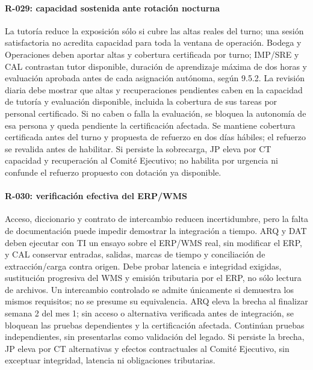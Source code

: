 \paragraph{R-029: capacidad sostenida ante rotación nocturna}
La tutoría reduce la exposición sólo si cubre las altas reales del turno; una
sesión satisfactoria no acredita capacidad para toda la ventana de operación.
Bodega y Operaciones deben aportar altas y cobertura certificada por turno;
IMP/SRE y CAL contrastan tutor disponible, duración de aprendizaje máxima de dos
horas y evaluación aprobada antes de cada asignación autónoma, según 9.5.2.
La revisión diaria debe mostrar que altas y recuperaciones pendientes caben en
la capacidad de tutoría y evaluación disponible, incluida la cobertura de sus
tareas por personal certificado. Si no caben o falla la evaluación, se bloquea
la autonomía de esa persona y queda pendiente la certificación afectada.
Se mantiene cobertura certificada antes del turno y propuesta de refuerzo en dos
días hábiles; el refuerzo se revalida antes de habilitar. Si persiste la sobrecarga,
JP eleva por CT capacidad y recuperación al Comité Ejecutivo; no habilita por
urgencia ni confunde el refuerzo propuesto con dotación ya disponible.

\paragraph{R-030: verificación efectiva del ERP/WMS}
Acceso, diccionario y contrato de intercambio reducen incertidumbre, pero la
falta de documentación puede impedir demostrar la integración a tiempo.
ARQ y DAT deben ejecutar con TI un ensayo sobre el ERP/WMS real, sin modificar
el ERP, y CAL conservar entradas, salidas, marcas de tiempo y conciliación de
extracción/carga contra origen. Debe probar latencia e integridad exigidas,
sustitución progresiva del WMS y emisión tributaria por el ERP, no sólo lectura
de archivos. Un intercambio controlado se admite únicamente si demuestra los
mismos requisitos; no se presume su equivalencia. ARQ eleva la brecha al finalizar
semana 2 del mes 1; sin acceso o alternativa verificada antes de integración,
se bloquean las pruebas dependientes y la certificación afectada. Continúan
pruebas independientes, sin presentarlas como validación del legado. Si persiste
la brecha, JP eleva por CT alternativas y efectos contractuales al Comité
Ejecutivo, sin exceptuar integridad, latencia ni obligaciones tributarias.

